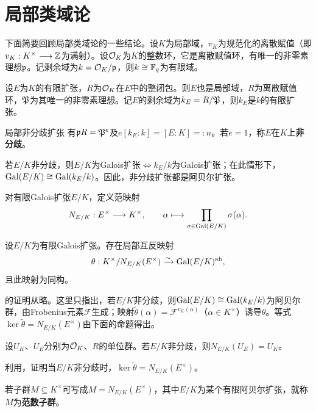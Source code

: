 \section{局部类域论}\label{L3S2}
下面简要回顾局部类域论的一些结论。设$K$为局部域，$v_K$为规范化的离散赋值（即$v_K:K^\times\longrightarrow\mathbb{Z}$为满射）。设$\mathcal O_K$为$K$的整数环，它是离散赋值环，有唯一的非零素理想$\mathfrak{p}$。记剩余域为$k=\mathcal O_K/\mathfrak{p}$，则$k\cong\mathbb{F}_q$为有限域。
\begin{property}
设$E$为$K$的有限扩张，$R$为$\mathcal O_K$在$E$中的整闭包。则$E$也是局部域，$R$为离散赋值环，$\mathfrak{P}$为其唯一的非零素理想。记$E$的剩余域为$k_E=R/\mathfrak{P}$，则$k_E$是$k$的有限扩张。
\end{property}
\begin{definition*}{局部非分歧扩张}
有$\mathfrak{p} R=\mathfrak{P}^e$及$e[k_E:k]=[E:K]=:n$。若$e=1$，称$E$在$K$上\textbf{非分歧}。
\end{definition*}
\begin{property}
若$E/K$非分歧，则$E/K$为Galois扩张$\iff k_E/k$为Galois扩张；在此情形下，$\operatorname{Gal}(E/K)\cong\operatorname{Gal}(k_E/k)$。因此，非分歧扩张都是阿贝尔扩张。
\end{property}
对有限Galois扩张$E/K$，定义范映射
\[N_{E/K}:E^\times\longrightarrow K^\times,\qquad\alpha\longmapsto\prod_{\sigma\in\operatorname{Gal}(E/K)}\sigma(\alpha).\]
\begin{theorem}\label{L3S2O1}
设$E/K$为有限Galois扩张。存在局部互反映射
\[\theta:K^\times/N_{E/K}(E^\times)\xrightarrow{\sim}\operatorname{Gal}(E/K)^{\mathrm{ab}},\]
且此映射为同构。
\end{theorem}
的证明从略。这里只指出，若$E/K$非分歧，则$\operatorname{Gal}(E/K)\cong\operatorname{Gal}(k_E/k)$为阿贝尔群，由Frobenius元素$\mathcal F$生成；映射$\widetilde\theta(\alpha)=\mathcal F^{v_K(\alpha)}$（$\alpha\in K^\times$）诱导$\theta$。等式$\ker\widetilde\theta=N_{E/K}(E^\times)$由下面的命题得出。
\begin{proposition}\label{L3S2O2}
设$U_K$、$U_E$分别为$\mathcal O_K$、$R$的单位群。若$E/K$非分歧，则$N_{E/K}(U_E)=U_K$。
\end{proposition}
\begin{exercise*}\label{L3S2EX}
利用，证明当$E/K$非分歧时，$\ker\widetilde\theta=N_{E/K}(E^\times)$。
\end{exercise*}
若子群$M\subseteq K^\times$可写成$M=N_{E/K}(E^\times)$，其中$E/K$为某个有限阿贝尔扩张，就称$M$为\textbf{范数子群}。
